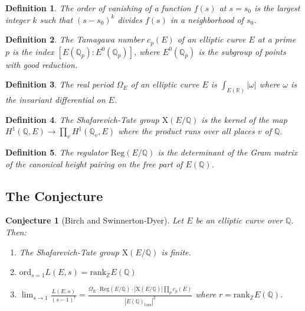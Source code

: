 \documentclass{article}
\newtheorem{conjecture}{Conjecture}
\newtheorem{definition}{Definition}
\begin{document}
\begin{definition}
  The order of vanishing of a function $f (s)$ at $s = s_0$ is the largest
  integer $k$ such that $(s - s_0)^k$ divides $f (s)$ in a neighborhood of
  $s_0$.
\end{definition}

\begin{definition}
  The Tamagawa number $c_p (E)$ of an elliptic curve $E$ at a prime $p$ is the
  index $[E (\mathbb{Q}_p) : E^0 (\mathbb{Q}_p)]$, where $E^0 (\mathbb{Q}_p)$
  is the subgroup of points with good reduction.
\end{definition}

\begin{definition}
  The real period $\Omega_E$ of an elliptic curve $E$ is $\int_{E
  (\mathbb{R})} | \omega |$ where $\omega$ is the invariant differential on
  $E$.
\end{definition}

\begin{definition}
  The Shafarevich-Tate group $\mathrm{X} (E /\mathbb{Q})$ is the kernel of the
  map $H^1 (\mathbb{Q}, E) \to \prod_v H^1 (\mathbb{Q}_v, E)$ where the
  product runs over all places $v$ of $\mathbb{Q}$.
\end{definition}

\begin{definition}
  The regulator $\mathrm{Reg} (E /\mathbb{Q})$ is the determinant of the Gram
  matrix of the canonical height pairing on the free part of $E (\mathbb{Q})$.
\end{definition}

\subsection{The Conjecture}

\begin{conjecture}
  [Birch and Swinnerton-Dyer] Let $E$ be an elliptic curve over $\mathbb{Q}$.
  Then:
  \begin{enumerate}
    \item The Shafarevich-Tate group $\mathrm{X} (E /\mathbb{Q})$ is finite.
    
    \item $\mathrm{ord}_{s = 1} L (E, s) = \mathrm{rank}_{\mathbb{Z}} E
    (\mathbb{Q})$
    
    \item $\lim_{s \to 1}  \frac{L (E, s)}{(s - 1)^r} = \frac{\Omega_E \cdot
    \mathrm{Reg} (E /\mathbb{Q}) \cdot | \mathrm{X} (E /\mathbb{Q}) |  \prod_p
    c_p (E)}{|E (\mathbb{Q})_{\mathrm{tors}} |^2}$ where $r =
    \mathrm{rank}_{\mathbb{Z}} E (\mathbb{Q})$.
  \end{enumerate}
\end{conjecture}
\end{document}
